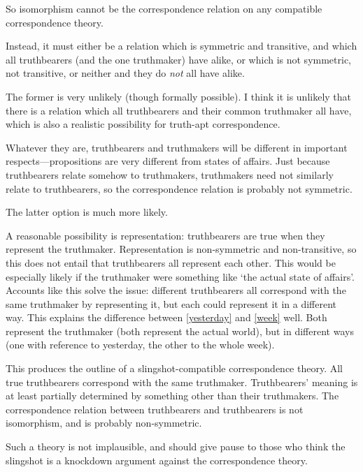 So isomorphism cannot be the correspondence relation on any compatible correspondence theory.

Instead, it must either be a relation which is symmetric and transitive, and which all truthbearers (and the one truthmaker) have alike, or which is not symmetric, not transitive, or neither and they do \emph{not} all have alike.

The former is very unlikely (though formally possible).
I think it is unlikely that there is a relation which all truthbearers and their common truthmaker all have, which is also a realistic possibility for truth-apt correspondence.

Whatever they are, truthbearers and truthmakers will be different in important respects---propositions are very different from states of affairs.
Just because truthbearers relate somehow to truthmakers, truthmakers need not similarly relate to truthbearers, so the correspondence relation is probably not symmetric.

The latter option is much more likely.

A reasonable possibility is representation: truthbearers are true when they represent the truthmaker.
Representation is non-symmetric and non-transitive, so this does not entail that truthbearers all represent each other.
This would be especially likely if the truthmaker were something like `the actual state of affairs'.
Accounts like this solve the issue: different truthbearers all correspond with the same truthmaker by representing it, but each could represent it in a different way.
This explains the difference between \ref{yesterday} and \ref{week} well.
Both represent the truthmaker (both represent the actual world), but in different ways (one with reference to yesterday, the other to the whole week).

This produces the outline of a slingshot-compatible correspondence theory.
All true truthbearers correspond with the same truthmaker.
Truthbearers' meaning is at least partially determined by something other than their truthmakers.
The correspondence relation between truthbearers and truthbearers is not isomorphism, and is probably non-symmetric.

Such a theory is not implausible, and should give pause to those who think the slingshot is a knockdown argument against the correspondence theory.
